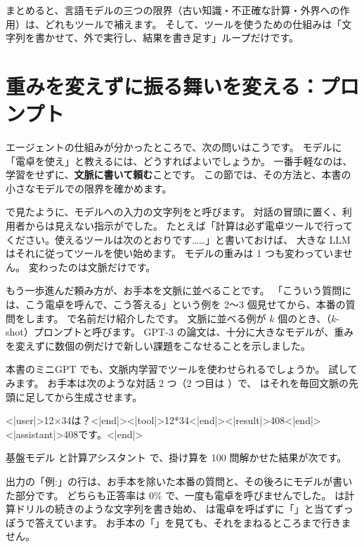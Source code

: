 まとめると、言語モデルの三つの限界（古い知識・不正確な計算・外界への作用）は、どれもツールで補えます。
そして、ツールを使うための仕組みは「文字列を書かせて、外で実行し、結果を書き足す」ループだけです。

\section{重みを変えずに振る舞いを変える：プロンプト}\label{sec:agent-prompt}

エージェントの仕組みが分かったところで、次の問いはこうです。
モデルに「電卓を使え」と教えるには、どうすればよいでしょうか。
一番手軽なのは、学習をせずに、\textbf{文脈に書いて頼む}ことです。
この節では、その方法と、本書の小さなモデルでの限界を確かめます。

で見たように、モデルへの入力の文字列をと呼びます。
対話の冒頭に置く、利用者からは見えない指示がでした。
たとえば「計算は必ず電卓ツールで行ってください。使えるツールは次のとおりです……」と書いておけば、
大きな LLM はそれに従ってツールを使い始めます。
モデルの重みは 1 つも変わっていません。
変わったのは文脈だけです。

もう一歩進んだ頼み方が、お手本を文脈に並べることです。
「こういう質問には、こう電卓を呼んで、こう答える」という例を 2〜3 個見せてから、本番の質問をします。
で名前だけ紹介したです。
文脈に並べる例が $k$ 個のとき、（$k$-shot）プロンプトと呼びます。
GPT-3 の論文\cite{brown2020language}は、十分に大きなモデルが、重みを変えずに数個の例だけで新しい課題をこなせることを示しました。

本書のミニGPT でも、文脈内学習でツールを使わせられるでしょうか。
試してみます。
お手本は次のような対話 2 つ（2 つ目は ）で、 はそれを毎回文脈の先頭に足してから生成させます。

\begin{textcode}
<|user|>12×34は？<|end|><|tool|>12*34<|end|><|result|>408<|end|><|assistant|>408です。<|end|>
\end{textcode}

基盤モデル  と計算アシスタント  で、掛け算を 100 問解かせた結果が次です。


出力の「例:」の行は、お手本を除いた本番の質問と、その後ろにモデルが書いた部分です。
どちらも正答率は 0\% で、一度も電卓を呼びませんでした。
 は計算ドリルの続きのような文字列を書き始め、 は電卓を呼ばずに「」と当てずっぽうで答えています。
お手本の「」を見ても、それをまねるところまで行きません。

